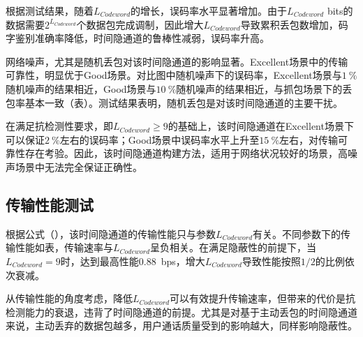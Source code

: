 根据测试结果，随着$L_{Codeword}$的增长，误码率水平显著增加。由于$L_{Codeword}$ bits的数据需要$2^{L_{Codeword}}$个数据包完成调制，因此增大$L_{Codeword}$导致累积丢包数增加，码字鉴别准确率降低，时间隐通道的鲁棒性减弱，误码率升高。

网络噪声，尤其是随机丢包对该时间隐通道的影响显著。Excellent场景中的传输可靠性，明显优于Good场景。对比图中随机噪声下的误码率，Excellent场景与{$1\ \%$}随机噪声的结果相近，Good场景与{$10\ \%$}随机噪声的结果相近，与抓包场景下的丢包率基本一致（表）。测试结果表明，随机丢包是对该时间隐通道的主要干扰。

在满足抗检测性要求，即$L_{Codeword}\ge 9$的基础上，该时间隐通道在Excellent场景下可以保证{$2\ \%$}左右的误码率；Good场景中误码率水平上升至{$15\ \%$}左右，对传输可靠性存在考验。因此，该时间隐通道构建方法，适用于网络状况较好的场景，高噪声场景中无法完全保证正确性。

\subsection{传输性能测试}
\label{chap:zigzag:results:throughput}


根据公式（），该时间隐通道的传输性能只与参数$L_{Codeword}$有关。不同参数下的传输性能如表，传输速率与$L_{Codeword}$呈负相关。在满足隐蔽性的前提下，当$L_{Codeword}=9$时，达到最高性能{0.88\ bps}，增大$L_{Codeword}$导致性能按照$1/2$的比例依次衰减。

从传输性能的角度考虑，降低$L_{Codeword}$可以有效提升传输速率，但带来的代价是抗检测能力的衰退，违背了时间隐通道的前提。尤其是对基于主动丢包的时间隐通道来说，主动丢弃的数据包越多，用户通话质量受到的影响越大，同样影响隐蔽性。

